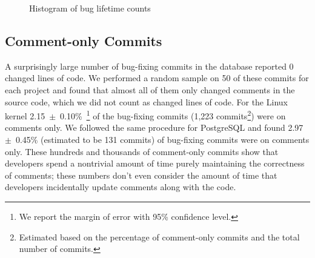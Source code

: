 \begin{figure}[tbh]
\centering
{}
\caption{\label{fig-bug-lifetime}Histogram of bug lifetime counts}
\end{figure}

\subsection{Comment-only Commits}
\label{sec-comment-only}
A surprisingly large number of bug-fixing commits in the database
reported 0 changed lines of code. We performed a random sample on 50 of these
commits for each project and found that almost all of them only changed comments in the
source code, which we did not count as changed lines of code. For the Linux kernel 
2.15~$\pm$~0.10\%~\footnote{We report
the margin of error with 95\% confidence level.} 
of the bug-fixing
commits (1,223 commits\footnote{Estimated based on the percentage of comment-only
commits and the total number of commits.}) were on comments only. We followed the same procedure for
PostgreSQL and found 2.97~$\pm$~0.45\% (estimated to be 131 commits) of bug-fixing commits were on
comments only.
These hundreds and thousands of comment-only commits show that developers spend a nontrivial amount of time purely maintaining
the correctness of comments; these numbers don't even consider the amount of
time that developers incidentally update comments along with the code.

